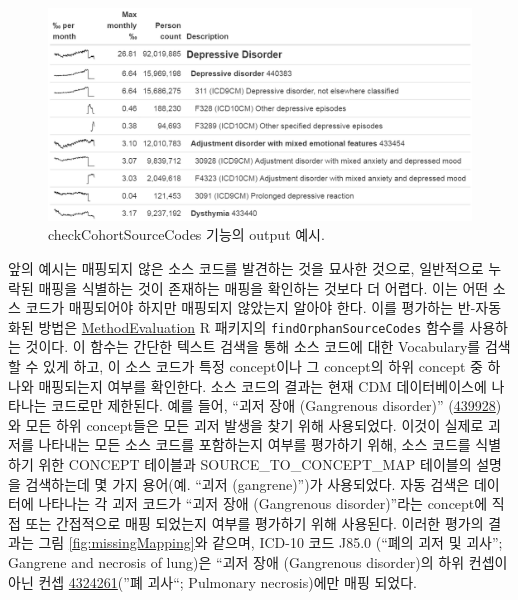 \documentclass[11pt]{book}
\theoremstyle{definition}
\theoremstyle{definition}
\theoremstyle{definition}
\theoremstyle{remark}
\begin{document}
\begin{figure}

{\centering \includegraphics[width=1\linewidth]{images/DataQuality/sourceCodes} 

}

\caption{checkCohortSourceCodes 기능의 output 예시. }\label{fig:sourceCodes}
\end{figure}

앞의 예시는 매핑되지 않은 소스 코드를 발견하는 것을 묘사한 것으로,
일반적으로 누락된 매핑을 식별하는 것이 존재하는 매핑을 확인하는 것보다
더 어렵다. 이는 어떤 소스 코드가 매핑되어야 하지만 매핑되지 않았는지
알아야 한다. 이를 평가하는 반-자동화된 방법은
\href{https://ohdsi.github.io/MethodEvaluation/}{MethodEvaluation} R
패키지의 \texttt{findOrphanSourceCodes} 함수를 사용하는 것이다. 이
함수는 간단한 텍스트 검색을 통해 소스 코드에 대한 Vocabulary를 검색할 수
있게 하고, 이 소스 코드가 특정 concept이나 그 concept의 하위 concept 중
하나와 매핑되는지 여부를 확인한다. 소스 코드의 결과는 현재 CDM
데이터베이스에 나타나는 코드로만 제한된다. 예를 들어, ``괴저 장애
(Gangrenous disorder)''
(\href{http://athena.ohdsi.org/search-terms/terms/439928}{439928}) 와
모든 하위 concept들은 모든 괴저 발생을 찾기 위해 사용되었다. 이것이
실제로 괴저를 나타내는 모든 소스 코드를 포함하는지 여부를 평가하기 위해,
소스 코드를 식별하기 위한 CONCEPT 테이블과 SOURCE\_TO\_CONCEPT\_MAP
테이블의 설명을 검색하는데 몇 가지 용어(예. ``괴저 (gangrene)'')가
사용되었다. 자동 검색은 데이터에 나타나는 각 괴저 코드가 ``괴저 장애
(Gangrenous disorder)''라는 concept에 직접 또는 간접적으로 매핑 되었는지
여부를 평가하기 위해 사용된다. 이러한 평가의 결과는 그림
\ref{fig:missingMapping}와 같으며, ICD-10 코드 J85.0 (``폐의 괴저 및
괴사''; Gangrene and necrosis of lung)은 ``괴저 장애 (Gangrenous
disorder)의 하위 컨셉이 아닌 컨셉
\href{http://athena.ohdsi.org/search-terms/terms/4324261}{4324261}(''폐
괴사``; Pulmonary necrosis)에만 매핑 되었다. 
\end{document}
